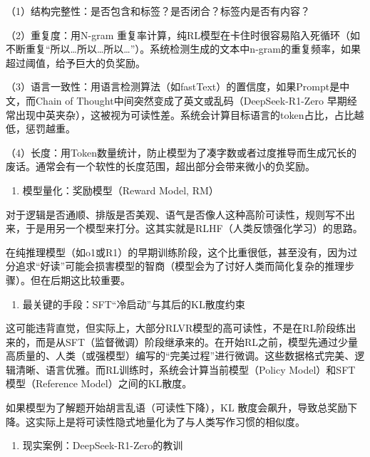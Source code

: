 （1）结构完整性：是否包含和标签？是否闭合？标签内是否有内容？

（2）重复度：用N-gram 重复率计算，纯RL模型在卡住时很容易陷入死循环（如不断重复``所以\ldots 所以\ldots 所以\ldots{}''）。系统检测生成的文本中n-gram的重复频率，如果超过阈值，给予巨大的负奖励。

（3）语言一致性：用语言检测算法（如fastText）的置信度，如果Prompt是中文，而Chain of Thought中间突然变成了英文或乱码（DeepSeek-R1-Zero 早期经常出现中英夹杂），这被视为可读性差。系统会计算目标语言的token占比，占比越低，惩罚越重。

（4）长度：用Token数量统计，防止模型为了凑字数或者过度推导而生成冗长的废话。通常会有一个软性的长度范围，超出部分会带来微小的负奖励。

\begin{enumerate}
\def\labelenumi{\arabic{enumi}.}
\setcounter{enumi}{1}
\tightlist
\item
  模型量化：奖励模型（Reward Model, RM）
\end{enumerate}

对于逻辑是否通顺、排版是否美观、语气是否像人这种高阶可读性，规则写不出来，于是用另一个模型来打分。这其实就是RLHF（人类反馈强化学习）的思路。

在纯推理模型（如o1或R1）的早期训练阶段，这个比重很低，甚至没有，因为过分追求``好读''可能会损害模型的智商（模型会为了讨好人类而简化复杂的推理步骤）。但在后期这比较重要。

\begin{enumerate}
\def\labelenumi{\arabic{enumi}.}
\setcounter{enumi}{2}
\tightlist
\item
  最关键的手段：SFT``冷启动''与其后的KL散度约束
\end{enumerate}

这可能违背直觉，但实际上，大部分RLVR模型的高可读性，不是在RL阶段练出来的，而是从SFT（监督微调）阶段继承来的。在开始RL之前，模型先通过少量高质量的、人类（或强模型）编写的``完美过程''进行微调。这些数据格式完美、逻辑清晰、语言优雅。而RL训练时，系统会计算当前模型（Policy Model）和SFT模型（Reference Model）之间的KL散度。

如果模型为了解题开始胡言乱语（可读性下降），KL 散度会飙升，导致总奖励下降。这实际上是将可读性隐式地量化为了与人类写作习惯的相似度。

\begin{enumerate}
\def\labelenumi{\arabic{enumi}.}
\setcounter{enumi}{3}
\tightlist
\item
  现实案例：DeepSeek-R1-Zero的教训
\end{enumerate}

